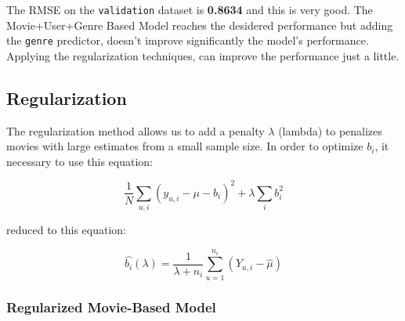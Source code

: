 \documentclass[
]{article}
\newenvironment{Shaded}{}{}
\newcommand{\AttributeTok}[1]{\textcolor[rgb]{0.49,0.56,0.16}{#1}}
\newcommand{\CommentTok}[1]{\textcolor[rgb]{0.38,0.63,0.69}{\textit{#1}}}
\newcommand{\FunctionTok}[1]{\textcolor[rgb]{0.02,0.16,0.49}{#1}}
\newcommand{\NormalTok}[1]{#1}
\newcommand{\OtherTok}[1]{\textcolor[rgb]{0.00,0.44,0.13}{#1}}
\newcommand{\SpecialCharTok}[1]{\textcolor[rgb]{0.25,0.44,0.63}{#1}}
\newcommand{\StringTok}[1]{\textcolor[rgb]{0.25,0.44,0.63}{#1}}
\begin{document}
\begin{Shaded}
\end{Shaded}

The RMSE on the \texttt{validation} dataset is \textbf{0.8634} and this
is very good. The Movie+User+Genre Based Model reaches the desidered
performance but adding the \texttt{genre} predictor, doesn't improve
significantly the model's performance. Applying the regularization
techniques, can improve the performance just a little.

\hypertarget{regularization}{%
\subsection{Regularization}\label{regularization}}

The regularization method allows us to add a penalty \(\lambda\)
(lambda) to penalizes movies with large estimates from a small sample
size. In order to optimize \(b_i\), it necessary to use this equation:

\[\frac{1}{N} \sum_{u,i} (y_{u,i} - \mu - b_{i})^{2} + \lambda \sum_{i} b_{i}^2\]

reduced to this equation:

\[\hat{b_{i}} (\lambda) = \frac{1}{\lambda + n_{i}} \sum_{u=1}^{n_{i}} (Y_{u,i} - \hat{\mu}) \]

\hypertarget{regularized-movie-based-model}{%
\subsubsection{Regularized Movie-Based
Model}\label{regularized-movie-based-model}}
\end{document}
